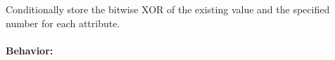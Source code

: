 Conditionally store the bitwise XOR of the existing value and the specified
number for each attribute.

\paragraph{Behavior:}
\begin{itemize}[noitemsep]


\end{itemize}
